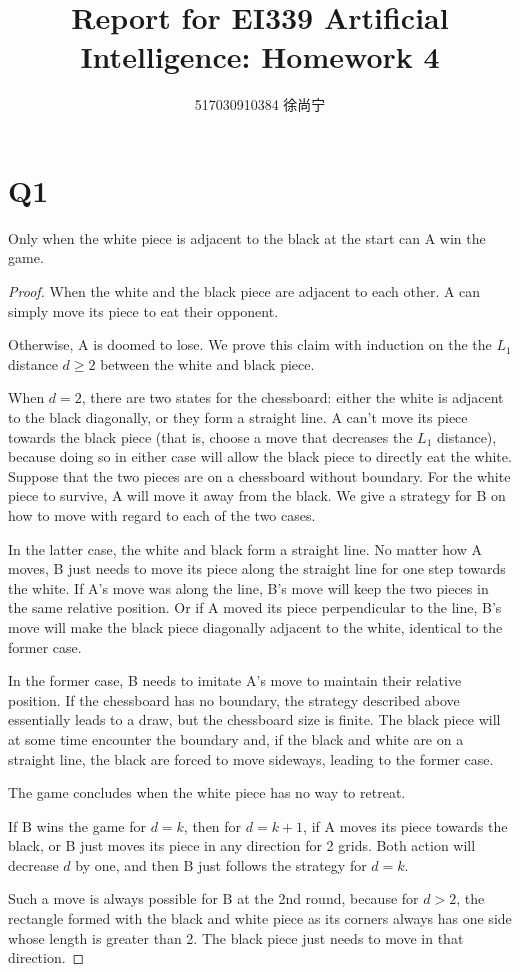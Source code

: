 \documentclass[a4paper]{article}
\title{Report for EI339 Artificial Intelligence: Homework 4}
\author{517030910384 徐尚宁}
\date{}
\begin{document}
\begin{CJK}{UTF8}{gbsn}
    \maketitle
\end{CJK}

\section*{Q1}

Only when the white piece is adjacent to the black at the start can A win the
game.

\begin{proof}
    When the white and the black piece are adjacent to each other. A can simply
    move its piece to eat their opponent.

    Otherwise, A is doomed to lose. We prove this claim with induction on the
    the $L_1$ distance $d \geq 2$ between the white and black piece.

    When $d = 2$, there are two states for the chessboard: either the white is
    adjacent to the black diagonally, or they form a straight line. A can't move
    its piece towards the black piece (that is, choose a move that decreases the
    $L_1$ distance), because doing so in either case will allow the black piece
    to directly eat the white. Suppose that the two pieces are on a chessboard
    without boundary. For the white piece to survive, A will move it away from
    the black. We give a strategy for B on how to move with regard to each of
    the two cases.

    In the latter case, the white and black form a straight line. No matter how
    A moves, B just needs to move its piece along the straight line for one step
    towards the white. If A's move was along the line, B's move will keep the
    two pieces in the same relative position. Or if A moved its piece
    perpendicular to the line, B's move will make the black piece diagonally
    adjacent to the white, identical to the former case.

    In the former case, B needs to imitate A's move to maintain their relative
    position. If the chessboard has no boundary, the strategy described above
    essentially leads to a draw, but the chessboard size is finite. The black
    piece will at some time encounter the boundary and, if the black and white
    are on a straight line, the black are forced to move sideways, leading to
    the former case.

    The game concludes when the white piece has no way to retreat.

    If B wins the game for $d = k$, then for $d = k + 1$, if A moves its piece
    towards the black, or B just moves its piece in any direction for 2 grids.
    Both action will decrease $d$ by one, and then B just follows the strategy
    for $d = k$.

    Such a move is always possible for B at the 2nd round, because for $d > 2$,
    the rectangle formed with the black and white piece as its corners always
    has one side whose length is greater than 2. The black piece just needs to
    move in that direction.
\end{proof}
\end{document}
